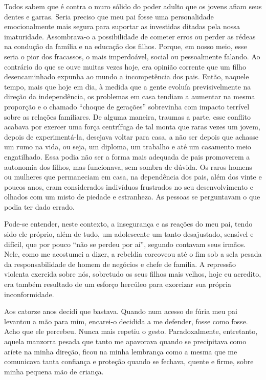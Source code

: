 Todos sabem que é contra o muro sólido do poder adulto que os jovens afiam seus dentes e garras. 
Seria preciso que meu pai fosse uma personalidade emocionalmente mais segura para suportar as investidas ditadas pela nossa imaturidade. 
Assombrava-o a possibilidade de cometer erros ou perder as rédeas na condução da família e na educação dos filhos. 
Porque, em nosso meio, esse seria o pior dos fracassos, o mais imperdoável, social ou pessoalmente falando. 
Ao contrário do que se ouve muitas vezes hoje, era opinião corrente que um filho desencaminhado expunha ao mundo a incompetência dos pais. 
Então, naquele tempo, mais que hoje em dia, à medida que a gente evoluía previsivelmente na direção da independência, os problemas em casa tendiam a aumentar na mesma proporção e o chamado ``choque de gerações'' sobrevinha com impacto terrível sobre as relações familiares. 
De alguma maneira, traumas a parte, esse conflito acabava por exercer uma força centrífuga de tal monta que raras vezes um jovem, depois de experimentá-la, desejava voltar para casa, a não ser depois que achasse um rumo na vida, ou seja, um diploma, um trabalho e até um casamento meio engatilhado. 
Essa podia não ser a forma mais adequada de pais promoverem a autonomia dos filhos, mas funcionava, sem sombra de dúvida. 
Os raros homens ou mulheres que permaneciam em casa, na dependência dos pais, além dos vinte e poucos anos, eram considerados indivíduos frustrados no seu desenvolvimento e olhados com um misto de piedade e estranheza.
As pessoas se perguntavam o que podia ter dado errado.  

Pode-se entender, neste contexto, a insegurança e as reações do meu pai, tendo sido ele próprio, além de tudo, um adolescente um tanto desajustado, sensível e difícil, que por pouco ``não se perdeu por aí'', segundo contavam seus irmãos. 
Nele, como me acostumei a dizer, a rebeldia corcoveou até o fim sob a sela pesada da responsabilidade de homem de negócios e chefe de família. 
A repressão violenta exercida sobre nós, sobretudo os seus filhos mais velhos, hoje eu acredito, era também resultado de um esforço hercúleo para exorcizar sua própria inconformidade.

Aos catorze anos decidi que bastava. 
Quando num acesso de fúria meu pai levantou a mão para mim, encarei-o decidida a me defender, fosse como fosse. 
Acho que ele percebeu. Nunca mais repetiu o gesto. 
Paradoxalmente, entretanto, aquela manzorra pesada que tanto me apavorava quando se precipitava como aríete na minha direção, ficou na minha lembrança como a mesma que me comunicava tanta confiança e proteção quando se fechava, quente e firme, sobre minha pequena mão de criança.